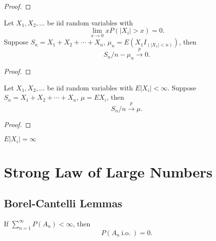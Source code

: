 \begin{proof}

\end{proof}

\begin{theorem}
	Let \(X_1,X_2,\ldots\) be iid random variables with
	\begin{equation}
		\lim_{x\rightarrow 0}xP(|X_i|>x)=0.
	\end{equation}
	Suppose \(S_n=X_1+X_2+\cdots+X_n\), \(\mu_n=E\left(X_1I_{(|X_1|<n)}\right)\), then
	\begin{equation}
		S_n/n-\mu_n\stackrel{p}{\rightarrow}0.
	\end{equation}
\end{theorem}

\begin{proof}

\end{proof}

\begin{theorem}\label{thm:WLLN}
	Let \(X_1,X_2,\ldots\) be iid random variables with \(E|X_i|<\infty\). Suppose \(S_n=X_1+X_2+\cdots+X_n\), \(\mu=EX_i\), then
	\begin{equation}
		S_n/n\stackrel{p}{\rightarrow}\mu.
	\end{equation}
\end{theorem}

\begin{proof}

\end{proof}

\begin{remark}
	\(E|X_i|=\infty\)
\end{remark}

\section{Strong Law of Large Numbers}

\subsection{Borel-Cantelli Lemmas}

\begin{lemma}\label{lem:borel-cantelli-lemma}
	If \(\sum_{n=1}^{\infty}P\left(A_{n}\right)<\infty\), then
	\begin{equation}
		P\left(A_{n}\ \text{i.o.}\ \right)=0.
	\end{equation}
\end{lemma}

